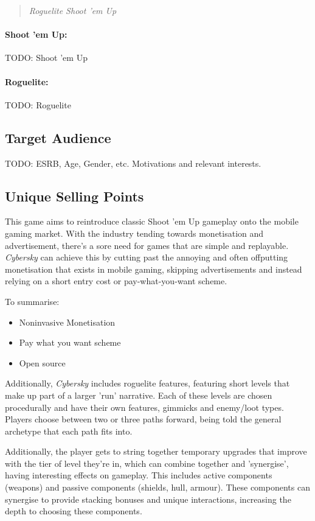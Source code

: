 \documentclass{scrartcl}
\begin{document}
\begin{quote}
  \emph{Roguelite Shoot 'em Up}
\end{quote}

\paragraph{Shoot 'em Up:}

TODO: Shoot 'em Up

\paragraph{Roguelite:}

TODO: Roguelite

\subsection{Target Audience}

TODO: ESRB, Age, Gender, etc. Motivations and relevant interests.

\subsection{Unique Selling Points}

This game aims to reintroduce classic Shoot 'em Up gameplay onto the mobile gaming market. With the industry tending towards monetisation and advertisement, there's a sore need for games that are simple and replayable. \emph{Cybersky} can achieve this by cutting past the annoying and often offputting monetisation that exists in mobile gaming, skipping advertisements and instead relying on a short entry cost or pay-what-you-want scheme.

To summarise:

\begin{itemize}
  \item Noninvasive Monetisation
  \item Pay what you want scheme
  \item Open source
\end{itemize}

Additionally, \emph{Cybersky} includes roguelite features, featuring short levels that make up part of a larger 'run' narrative. Each of these levels are chosen procedurally and have their own features, gimmicks and enemy/loot types. Players choose between two or three paths forward, being told the general archetype that each path fits into.

Additionally, the player gets to string together temporary upgrades that improve with the tier of level they're in, which can combine together and 'synergise', having interesting effects on gameplay. This includes active components (weapons) and passive components (shields, hull, armour). These components can synergise to provide stacking bonuses and unique interactions, increasing the depth to choosing these components.
\end{document}
